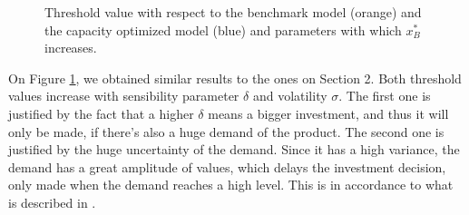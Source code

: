 

\begin{figure}[!htb]
	\begin{subfigmatrix}{2}
	\end{subfigmatrix}
	\caption{Threshold value with respect to the benchmark model (orange) and the capacity optimized model (blue) and parameters with which $x^*_B$ increases.}
	\label{fig:2_x2}
\end{figure}

On Figure \ref{fig:2_x2}, we obtained similar results to the ones on Section 2. Both threshold values increase with sensibility parameter $\delta$ and volatility $\sigma$. The first one is justified by the fact that a higher $\delta$ means a bigger investment, and thus it will only be made, if there's also a huge demand of the product. The second one is justified by the huge uncertainty of the demand. Since it has a high variance, the demand has a great amplitude of values, which delays the investment decision, only made when the demand reaches a high level. This is in accordance to what is described in \cite{dixit:book}.


